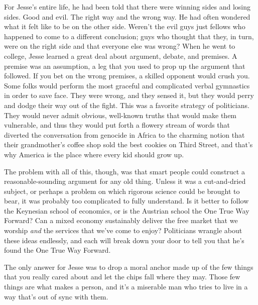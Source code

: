 \documentclass[12pt]{book}
\begin{document}
For Jesse's entire life, he had been told that there were winning sides and losing sides.  Good and evil.  The right way and the wrong way.  He had often wondered what it felt like to be on the other side.  Weren't the evil guys just fellows who happened to come to a different conclusion; guys who thought that they, in turn, were on the right side and that everyone else was wrong?  When he went to college, Jesse learned a great deal about argument, debate, and premises.  A premise was an assumption, a leg that you used to prop up the argument that followed.  If you bet on the wrong premises, a skilled opponent would crush you.  Some folks would perform the most graceful and complicated verbal gymnastics in order to save face.  They were wrong, and they sensed it, but they would perry and dodge their way out of the fight.  This was a favorite strategy of politicians.  They would never admit obvious, well-known truths that would make them vulnerable, and thus they would put forth a flowery stream of words that diverted the conversation from genocide in Africa to the charming notion that their grandmother's coffee shop sold the best cookies on Third Street, and that's why America is the place where every kid should grow up.

The problem with all of this, though, was that smart people could construct a reasonable-sounding argument for any old thing.  Unless it was a cut-and-dried subject, or perhaps a problem on which rigorous science could be brought to bear, it was probably too complicated to fully understand.  Is it better to follow the Keynesian school of economics, or is the Austrian school the One True Way Forward?  Can a mixed economy sustainably deliver the free market that we worship \emph{and} the services that we've come to enjoy?  Politicians wrangle about these ideas endlessly, and each will break down your door to tell you that he's found the One True Way Forward.

The only answer for Jesse was to drop a moral anchor made up of the few things that you really cared about and let the chips fall where they may.  Those few things are what makes a person, and it's a miserable man who tries to live in a way that's out of sync with them.
\end{document}
